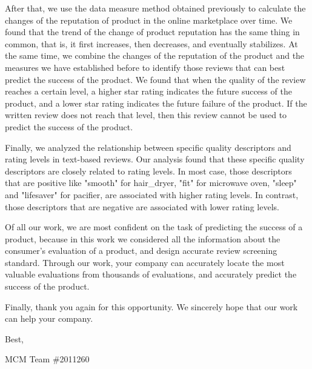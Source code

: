 \documentclass[12pt]{mcmthesis}
\begin{document}
After that, we use the data measure method obtained previously to calculate the changes of the reputation of product in the online marketplace over time. We found that the trend of the change of product reputation has the same thing in common, that is, it first increases, then decreases, and eventually stabilizes. At the same time, we combine the changes of the reputation of the product and the measures we have established before to identify those reviews that can best predict the success of the product. We found that when the quality of the review reaches a certain level, a higher star rating indicates the future success of the product, and a lower star rating indicates the future failure of the product. If the written review does not reach that level, then this review cannot be used to predict the success of the product.

Finally, we analyzed the relationship between specific quality descriptors and rating levels in text-based reviews. Our analysis found that these specific quality descriptors are closely related to rating levels. In most case, those descriptors that are positive like "smooth" for hair\_dryer, "fit" for microwave oven, "sleep" and "lifesaver" for pacifier, are associated with higher rating levels. In contrast, those descriptors that are negative are associated with lower rating levels.

Of all our work, we are most confident on the task of predicting the success of a product, because in this work we considered all the information about the consumer's evaluation of a product, and design accurate review screening standard. Through our work, your company can accurately locate the most valuable evaluations from thousands of evaluations, and accurately predict the success of the product.

Finally, thank you again for this opportunity. We sincerely hope that our work can help your company.

Best,

MCM Team \#2011260
\end{document}
